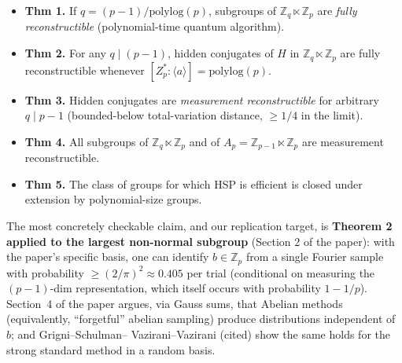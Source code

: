 \documentclass[11pt]{article}
\begin{document}
\begin{itemize}
\item \textbf{Thm 1.} If $q=(p-1)/\mathrm{polylog}(p)$, subgroups of
$\mathbb{Z}_q\!\ltimes\!\mathbb{Z}_p$ are \emph{fully reconstructible}
(polynomial-time quantum algorithm).
\item \textbf{Thm 2.} For any $q\mid(p-1)$, hidden conjugates of $H$ in
$\mathbb{Z}_q\!\ltimes\!\mathbb{Z}_p$ are fully reconstructible whenever
$[Z_p^{*}\!:\!\langle a\rangle]=\mathrm{polylog}(p)$.
\item \textbf{Thm 3.} Hidden conjugates are \emph{measurement reconstructible}
for arbitrary $q\mid p-1$ (bounded-below total-variation distance, $\ge 1/4$
in the limit).
\item \textbf{Thm 4.} All subgroups of $\mathbb{Z}_q\!\ltimes\!\mathbb{Z}_p$
and of $A_p = \mathbb{Z}_{p-1}\!\ltimes\!\mathbb{Z}_p$ are measurement
reconstructible.
\item \textbf{Thm 5.} The class of groups for which HSP is efficient is closed
under extension by polynomial-size groups.
\end{itemize}
The most concretely checkable claim, and our replication target, is
\textbf{Theorem 2 applied to the largest non-normal subgroup} (Section 2 of the
paper): with the paper's specific basis, one can identify $b\in\mathbb{Z}_p$
from a single Fourier sample with probability $\ge (2/\pi)^{2}\!\approx\!0.405$
per trial (conditional on measuring the $(p-1)$-dim representation, which
itself occurs with probability $1-1/p$). Section~4 of the paper argues, via
Gauss sums, that Abelian methods (equivalently, ``forgetful'' abelian
sampling) produce distributions independent of $b$; and Grigni--Schulman--
Vazirani--Vazirani (cited) show the same holds for the strong standard method
in a random basis.
\end{document}
